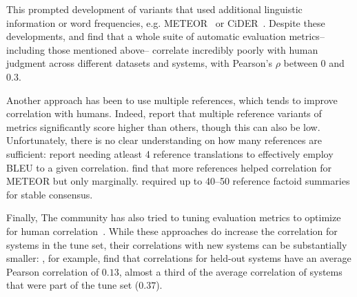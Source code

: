 This prompted development of variants that used additional linguistic information or word frequencies, e.g. METEOR~\citep{lavie2009meteor,denkowski2014meteor} or CiDER~\citep{vedantam2015cider}.
Despite these developments, \citet{liu2016evaluate} and \citet{novikova2017why} find that a whole suite of automatic evaluation metrics-- including those mentioned above--  correlate incredibly poorly with human judgment across different datasets and systems, with Pearson's $\rho$ between $0$ and $0.3$.

Another approach has been to use multiple references, which tends to improve correlation with humans.
Indeed, \citet{toutanova2016dataset} report that multiple reference variants of metrics significantly score higher than others, though this can also be low.
Unfortunately, there is no clear understanding on how many references are sufficient: 
  \citet{culy2003limits} report needing atleast 4 reference translations to effectively employ BLEU to a given correlation.
  \citet{lavie2009meteor} find that more references helped correlation for METEOR but only marginally.
\citet{vanhalteren2003factoid} required up to 40--50 reference factoid summaries for stable consensus.

Finally, The  community has also tried to tuning evaluation metrics to optimize for human correlation~\citep{lavie2009meteor,denkowski2014meteor,lowe2017towards}.
While these approaches do increase the correlation for systems in the tune set, their correlations with new systems can be substantially smaller: \citet{lowe2017towards}, for example, find that correlations for held-out systems have an average Pearson correlation of $0.13$, almost a third of the average correlation of systems that were part of the tune set ($0.37$).

